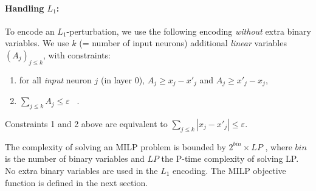 \label{s.L1}

	\paragraph{Handling $L_1$:} To encode an $L_1$-perturbation, we use the following encoding {\em without} extra binary variables. 
	We use $k$ (= number of input neurons) additional {\em linear} variables 
	$(A_j)_{j \leq k}$, with constraints:
	\begin{enumerate}
\item for all {\em input} neuron $j$ (in layer 0), 
	$A_j \geq x_j - x'_j $ and $A_j \geq x'_j - x_j$,

\item $\sum_{j\leq k} A_j \leq \varepsilon$ 
\quad \, .
	\end{enumerate}



\begin{proposition}
	\label{prop.L1}
	\cite{mosek_cookbook}
 Constraints 1 and 2 above are equivalent to $\sum_{j\leq k} |x_j-x'_j| \leq \varepsilon$.
\end{proposition}


The complexity of solving an MILP problem is bounded by $2^{bin} \times LP$ \cite{DivideAndSlide}, where $bin$ is the number of binary variables and $LP$ the P-time complexity of solving LP. 
No extra binary variables are used in the $L_1$ encoding.
The MILP objective function is defined in the next section.